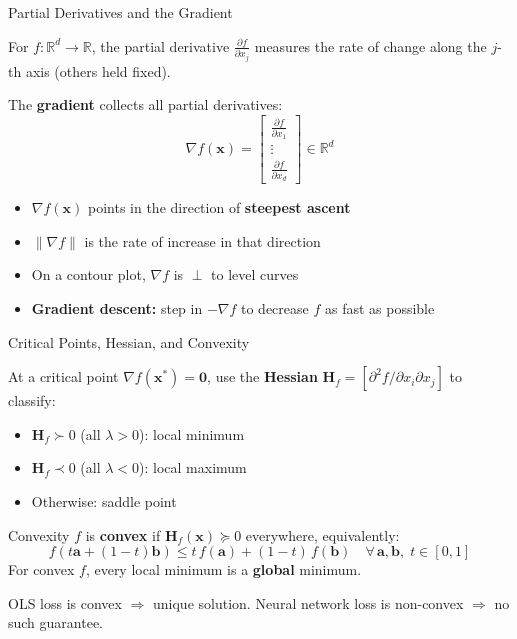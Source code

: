 \documentclass[aspectratio=169, professionalfonts]{beamer}
\def\R{\mathbb{R}}
\begin{document}
\begin{frame}{Partial Derivatives and the Gradient}

For $f : \R^d \to \R$, the partial derivative $\frac{\partial f}{\partial x_j}$ measures the rate of change along the $j$-th axis (others held fixed).

\bigskip

The \textbf{gradient} collects all partial derivatives:
$$\nabla f(\mathbf{x}) = \begin{bmatrix} \frac{\partial f}{\partial x_1} \\ \vdots \\ \frac{\partial f}{\partial x_d} \end{bmatrix} \in \R^d$$

\bigskip

\begin{itemize}
  \item $\nabla f(\mathbf{x})$ points in the direction of \textbf{steepest ascent}
  \item $\|\nabla f\|$ is the rate of increase in that direction
  \item On a contour plot, $\nabla f$ is $\perp$ to level curves
  \item \textbf{Gradient descent:} step in $-\nabla f$ to decrease $f$ as fast as possible
\end{itemize}

\end{frame}

\begin{frame}{Critical Points, Hessian, and Convexity}

At a critical point $\nabla f(\mathbf{x}^*) = \mathbf{0}$, use the \textbf{Hessian} $\mathbf{H}_f = [\partial^2 f / \partial x_i \partial x_j]$ to classify:

\begin{itemize}
  \item $\mathbf{H}_f \succ 0$ (all $\lambda > 0$): local minimum
  \item $\mathbf{H}_f \prec 0$ (all $\lambda < 0$): local maximum
  \item Otherwise: saddle point
\end{itemize}

\bigskip

\begin{block}{Convexity}
$f$ is \textbf{convex} if $\mathbf{H}_f(\mathbf{x}) \succeq 0$ everywhere, equivalently:
$$f(t\mathbf{a} + (1-t)\mathbf{b}) \leq t\,f(\mathbf{a}) + (1-t)\,f(\mathbf{b}) \quad \forall\, \mathbf{a}, \mathbf{b},\; t \in [0,1]$$
For convex $f$, every local minimum is a \textbf{global} minimum.
\end{block}

\bigskip

OLS loss is convex $\Rightarrow$ unique solution. Neural network loss is non-convex $\Rightarrow$ no such guarantee.

\end{frame}
\end{document}
